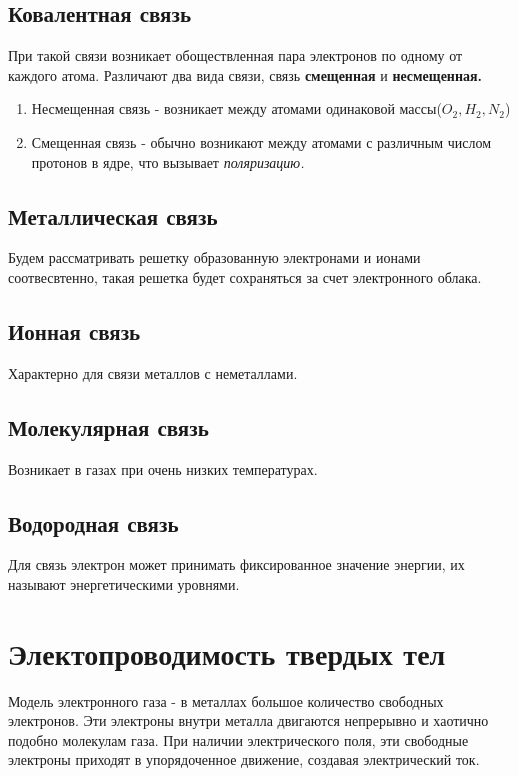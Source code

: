 \documentclass[../main.tex]{subfiles}
\begin{document}
\subsection{Ковалентная связь}

При такой связи возникает обоществленная пара электронов по одному от каждого атома. Различают два вида связи, связь \textbf{смещенная} и \textbf{несмещенная.}
\begin{enumerate}
    \item Несмещенная связь - возникает между атомами одинаковой массы($O_2, H_2, N_2$)
    \item Смещенная связь - обычно возникают между атомами с различным числом протонов в ядре, что вызывает \textit{поляризацию.}
\end{enumerate}

\subsection{Металлическая связь}
Будем рассматривать решетку образованную электронами и ионами соотвесвтенно, такая решетка будет сохраняться за счет электронного облака.

\subsection{Ионная связь}
Характерно для связи металлов с неметаллами.
\subsection{Молекулярная связь}
Возникает в газах при очень низких температурах.

\subsection{Водородная связь}

Для связь электрон может принимать фиксированное значение энергии, их называют энергетическими уровнями.

\section{Электопроводимость твердых тел}
Модель электронного газа - в металлах большое количество свободных электронов. Эти электроны внутри металла двигаются непрерывно и хаотично подобно молекулам газа.
При наличии электрического поля, эти свободные электроны приходят в упорядоченное движение, создавая электрический ток.
\end{document}
